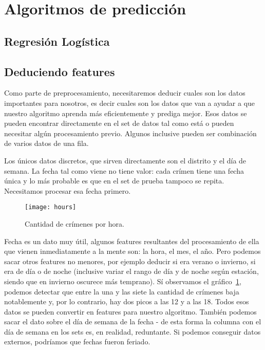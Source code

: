 
\section{Algoritmos de predicción} %
\label{sec:algoritmos_de_prediccion}

\subsection{Regresión Logística} %
\label{sub:regresion_logistica}



\subsection{Deduciendo features} %
\label{sub:deduciendo_features}

Como parte de preprocesamiento, necesitaremos deducir cuales son los datos importantes para nosotros, es decir cuales son los datos que van a ayudar a que nuestro algoritmo aprenda más eficientemente y prediga mejor. Esos datos se pueden encontrar directamente en el set de datos tal como está o pueden necesitar algún procesamiento previo. Algunos inclusive pueden ser combinación de varios datos de una fila.

Los únicos datos discretos, que sirven directamente son el distrito y el día de semana. La fecha tal como viene no tiene valor: cada crímen tiene una fecha única y lo más probable es que en el set de prueba tampoco se repita. Necesitamos procesar esa fecha primero.

\begin{figure}[H]
\texttt{[image: hours]}
\caption{Cantidad de crímenes por hora.}
\label{fig:hours}
\end{figure}

Fecha es un dato muy útil, algunos features resultantes del procesamiento de ella que vienen inmediatamente a la mente son: la hora, el mes, el año. Pero podemos sacar otros features no menores, por ejemplo deducir si era verano o invierno, si era de día o de noche (inclusive variar el rango de día y de noche según estación, siendo que en invierno oscurece más temprano). Sí observamos el gráfico~\ref{fig:hours}, podemos detectar que entre la una y las siete la cantidad de crímenes baja notablemente y, por lo contrario, hay dos picos a las 12 y a las 18. Todos esos datos se pueden convertir en features para nuestro algoritmo. También podemos sacar el dato sobre el día de semana de la fecha - de esta forma la columna con el día de semana en los sets es, en realidad, reduntante. Si podemos conseguir datos externos, podríamos que fechas fueron feriado.




